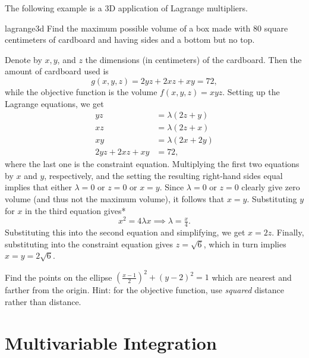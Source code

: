 \documentclass[svgnames]{watsonbook}
\begin{document}
  The following example is a 3D application of Lagrange multipliers. 
  
  \begin{example}{}{lagrange3d}
    Find the maximum possible volume of a box made with 80 square
    centimeters of cardboard and having sides and a bottom but no
    top. 
  \end{example}

  \begin{solution}
    Denote by $x,y$, and $z$ the dimensions (in centimeters) of the
    cardboard. Then the amount of cardboard used is
    \[
      g(x,y,z) = 2yz + 2xz + xy = 72, 
    \]
    while the objective function is the volume $f(x,y,z) =
    xyz$. Setting up the Lagrange equations, we get
    \begin{align*}
      yz &= \lambda(2z + y) \\
      xz &= \lambda(2z + x) \\
      xy &= \lambda(2x + 2y) \\
      2yz + 2xz + xy &= 72, 
    \end{align*}
    where the last one is the constraint equation. Multiplying the
    first two equations by $x$ and $y$, respectively, and the setting
    the resulting right-hand sides equal implies that either $\lambda
    = 0$ or $z= 0$ or  $x = y$. Since $\lambda = 0$ or $z = 0$ clearly
    give zero volume (and thus not the maximum volume), it follows
    that $x=y$. Substituting $y$ for $x$ in the third equation gives*
    \[
      x^2 = 4 \lambda x \implies \lambda = \tfrac{x}{4}. 
    \]
    Substituting this into the second equation and simplifying, we get
    $x = 2z$. Finally, substituting into the constraint equation gives
    $z = \sqrt{6}$, which in turn implies $x = y = 2\sqrt{6}$. 
  \end{solution}

  \begin{exercise}{}{}
    Find the points on the ellipse $\left(\frac{x - 1}{2}\right)^2 +
    (y-2)^2 = 1$ which are nearest and farther from the origin. Hint:
    for the objective function, use \textit{squared} distance rather
    than distance. 
  \end{exercise}
  
  \chapter{Multivariable Integration}
\end{document}
